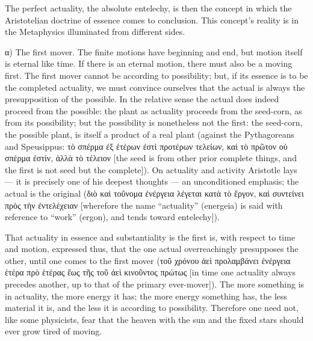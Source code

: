 \documentclass[12pt]{book}
\begin{document}
The perfect actuality, the absolute entelechy, is then the concept in which the Aristotelian
doctrine of essence comes to conclusion. This concept's reality is in the Metaphysics illuminated
from different sides.

α) The first mover. The finite motions have beginning and end, but motion itself is eternal like
time. If there is an eternal motion, there must also be a moving first. The first mover cannot be
according to possibility; but, if its essence is to be the completed actuality, we must convince
ourselves
that the actual is always the presupposition of the possible. In the relative sense the actual does
indeed proceed from the possible: the plant as actuality proceeds from the seed-corn, as from its
possibility; but the possibility is nonetheless not the first: the seed-corn, the possible plant, is
itself a product of a real plant (against the Pythagoreans and Speusippus: τὸ σπέρμα ἐξ ἑτέρων ἐστὶ
προτέρων τελείων, καὶ τὸ πρῶτον οὐ σπέρμα ἐστίν, ἀλλὰ τὸ τέλειον [the seed is from other prior
complete things, and the first is not seed but the complete]). On actuality and activity Aristotle
lays — it is precisely one of his deepest thoughts — an unconditioned emphasis; the actual is the
original (διὸ καὶ τοὔνομα ἐνέργεια λέγεται κατὰ τὸ ἔργον, καὶ συντείνει πρὸς τὴν ἐντελέχειαν
[wherefore the name ``actuality'' (energeia) is said with reference to ``work'' (ergon), and tends
toward entelechy]).

That actuality in essence and substantiality is the first is, with respect to time and motion,
expressed thus, that the one actual overreachingly presupposes the other, until one comes to the
first mover (τοῦ χρόνου ἀεὶ προλαμβάνει ἐνέργεια ἑτέρα πρὸ ἑτέρας ἕως τῆς τοῦ ἀεὶ κινοῦντος πρώτως
[in time one actuality always precedes another, up to that of the primary ever-mover]). The more
something is in actuality, the more energy it has; the more energy something has, the less material
it is, and the less it is according to possibility. Therefore one need not, like some physicists,
fear that the heaven with the sun and the fixed stars should ever grow tired of moving.
\end{document}
